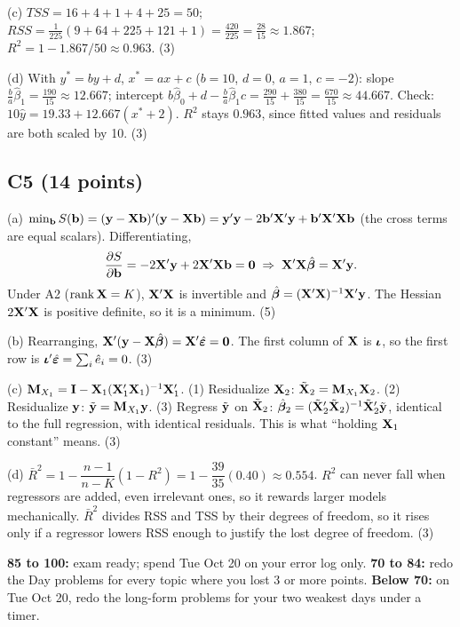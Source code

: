 \documentclass[11pt]{article}
\begin{document}
(c) $TSS=16+4+1+4+25=50$; \ $RSS=\tfrac{1}{225}(9+64+225+121+1)=\tfrac{420}{225}=\tfrac{28}{15}\approx1.867$; \ $R^2=1-1.867/50\approx0.963$. \hfill (3)

(d) With $y^*=by+d$, $x^*=ax+c$ ($b=10$, $d=0$, $a=1$, $c=-2$): slope $\tfrac{b}{a}\hat\beta_1=\tfrac{190}{15}\approx12.667$; intercept $b\hat\beta_0+d-\tfrac{b}{a}\hat\beta_1c=\tfrac{290}{15}+\tfrac{380}{15}=\tfrac{670}{15}\approx44.667$. Check: $10\hat y=19.33+12.667(x^*+2)$. $R^2$ stays $0.963$, since fitted values and residuals are both scaled by 10. \hfill (3)

\subsection{C5 (14 points)}
(a) $\min_{\mathbf b}S(\mathbf b)=(\mathbf{y}-\mathbf{X}\mathbf b)'(\mathbf{y}-\mathbf{X}\mathbf b)=\mathbf{y}'\mathbf{y}-2\mathbf b'\mathbf{X}'\mathbf{y}+\mathbf b'\mathbf{X}'\mathbf{X}\mathbf b$ (the cross terms are equal scalars). Differentiating,
\[ \frac{\partial S}{\partial\mathbf b}=-2\mathbf{X}'\mathbf{y}+2\mathbf{X}'\mathbf{X}\mathbf b=\mathbf0\;\Rightarrow\;\mathbf{X}'\mathbf{X}\hat{\bm{\beta}}=\mathbf{X}'\mathbf{y}. \]
Under A2 ($\operatorname{rank}\mathbf{X}=K$), $\mathbf{X}'\mathbf{X}$ is invertible and $\hat{\bm{\beta}}=(\mathbf{X}'\mathbf{X})^{-1}\mathbf{X}'\mathbf{y}$. The Hessian $2\mathbf{X}'\mathbf{X}$ is positive definite, so it is a minimum. \hfill (5)

(b) Rearranging, $\mathbf{X}'(\mathbf{y}-\mathbf{X}\hat{\bm{\beta}})=\mathbf{X}'\hat{\bm{\varepsilon}}=\mathbf0$. The first column of $\mathbf{X}$ is $\bm{\iota}$, so the first row is $\bm{\iota}'\hat{\bm{\varepsilon}}=\sum_i\hat e_i=0$. \hfill (3)

(c) $\mathbf{M}_{X_1}=\mathbf{I}-\mathbf{X}_1(\mathbf{X}_1'\mathbf{X}_1)^{-1}\mathbf{X}_1'$. (1) Residualize $\mathbf{X}_2$: $\tilde{\mathbf{X}}_2=\mathbf{M}_{X_1}\mathbf{X}_2$. (2) Residualize $\mathbf{y}$: $\tilde{\mathbf{y}}=\mathbf{M}_{X_1}\mathbf{y}$. (3) Regress $\tilde{\mathbf{y}}$ on $\tilde{\mathbf{X}}_2$: $\hat{\bm{\beta}}_2=(\tilde{\mathbf{X}}_2'\tilde{\mathbf{X}}_2)^{-1}\tilde{\mathbf{X}}_2'\tilde{\mathbf{y}}$, identical to the full regression, with identical residuals. This is what ``holding $\mathbf{X}_1$ constant'' means. \hfill (3)

(d) $\bar R^2=1-\dfrac{n-1}{n-K}(1-R^2)=1-\dfrac{39}{35}(0.40)\approx0.554$. $R^2$ can never fall when regressors are added, even irrelevant ones, so it rewards larger models mechanically. $\bar R^2$ divides RSS and TSS by their degrees of freedom, so it rises only if a regressor lowers RSS enough to justify the lost degree of freedom. \hfill (3)

\vspace{8pt}
\begin{keybox}
\textbf{85 to 100:} exam ready; spend Tue Oct 20 on your error log only. \quad \textbf{70 to 84:} redo the Day problems for every topic where you lost 3 or more points. \quad \textbf{Below 70:} on Tue Oct 20, redo the long-form problems for your two weakest days under a timer.
\end{keybox}
\end{document}
